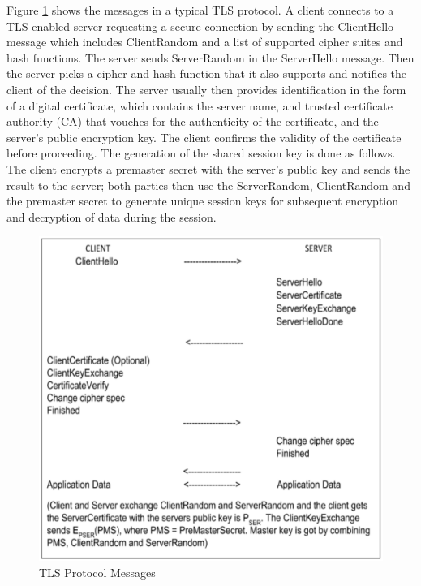 \begin{multicols}{2}
Figure \ref{chap2-fig5} shows the messages in a typical TLS protocol. A client connects to a TLS-enabled server requesting a secure connection by sending the ClientHello message which includes ClientRandom and a list of supported cipher suites and hash functions. The server sends ServerRandom in the ServerHello message. Then the server picks a cipher and hash function that it also supports and notifies the client of the decision. The server usually then provides identification in the form of a digital certificate, which contains the server name, and trusted certificate authority (CA) that vouches for the authenticity of the certificate, and the server's public encryption key. The client confirms the validity of the certificate before proceeding. The generation of the shared session key is done as follows. The client encrypts a premaster secret with the server's public key and sends the result to the server; both parties then use the ServerRandom, ClientRandom and the premaster secret to generate unique session keys for subsequent encryption and decryption of data during the session.
\end{multicols}

\begin{figure}[!ht]
\centering
\includegraphics{src/Figures/chap2/5.eps}
\caption{TLS Protocol Messages}\label{chap2-fig5}
\end{figure}

